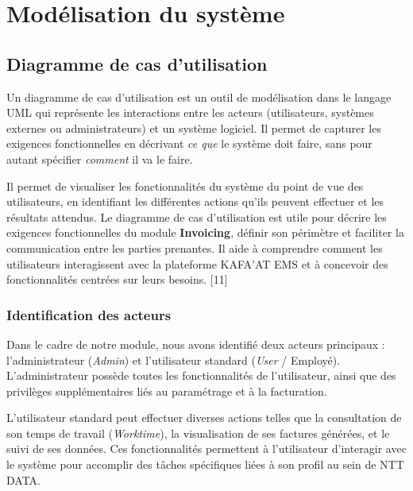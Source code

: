 \documentclass[12pt, a4paper, openany]{report}
\begin{document}
\vspace{-0.6cm}



\section{Modélisation du système}

\vspace{-0.7cm}
\subsection{Diagramme de cas d'utilisation}

\vspace{-0.4cm}
Un diagramme de cas d'utilisation est un outil de modélisation dans le langage UML qui représente les interactions entre les acteurs (utilisateurs, systèmes externes ou administrateurs) et un système logiciel. Il permet de capturer les exigences fonctionnelles en décrivant \textit{ce que} le système doit faire, sans pour autant spécifier \textit{comment} il va le faire.

Il permet de visualiser les fonctionnalités du système du point de vue des utilisateurs, en identifiant les différentes actions qu'ils peuvent effectuer et les résultats attendus. Le diagramme de cas d'utilisation est utile pour décrire les exigences fonctionnelles du module \textbf{Invoicing}, définir son périmètre et faciliter la communication entre les parties prenantes. Il aide à comprendre comment les utilisateurs interagissent avec la plateforme KAFA'AT EMS et à concevoir des fonctionnalités centrées sur leurs besoins. [11]

\vspace{-0.5cm}
\subsubsection{Identification des acteurs}

\vspace{-0.4cm}
Dans le cadre de notre module, nous avons identifié deux acteurs principaux : l'administrateur (\textit{Admin}) et l'utilisateur standard (\textit{User} / Employé). L'administrateur possède toutes les fonctionnalités de l'utilisateur, ainsi que des privilèges supplémentaires liés au paramétrage et à la facturation.

L'utilisateur standard peut effectuer diverses actions telles que la consultation de son temps de travail (\textit{Worktime}), la visualisation de ses factures générées, et le suivi de ses données. Ces fonctionnalités permettent à l'utilisateur d'interagir avec le système pour accomplir des tâches spécifiques liées à son profil au sein de NTT DATA.
\end{document}
